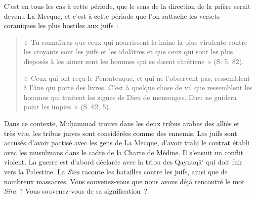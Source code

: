 C'est en tous les cas à cette période, que le sens de la direction de la
prière serait devenu La Mecque, et c'est à cette période que l'on
rattache les versets coraniques les plus hostiles aux juifs~:

\begin{quote}
    

«~Tu connaîtras que ceux qui nourrissent la haine la plus virulente
contre les croyants sont les juifs et les idolâtres et que ceux qui sont
les plus disposés à les aimer sont les hommes qui se disent chrétiens~»
(S. 5, 82).

«~Ceux qui ont reçu le Pentateuque, et qui ne l'observent pas,
ressemblent à l'âne qui porte des livres. C'est à quelque chose de vil
que ressemblent les hommes qui traitent les signes de Dieu de mensonges.
Dieu ne guidera point les impies~» (S. 62, 5).
\end{quote}
Dans ce contexte, Muḥammad trouve dans les deux tribus arabes des alliés
et très vite, les tribus juives sont considérées comme des ennemis. Les
juifs sont accusés d'avoir pactisé avec les gens de La Mecque, d'avoir
trahi le contrat établi avec les musulmans dans le cadre de la Charte de
Médine. Il s'ensuit un conflit violent. La guerre est d'abord déclarée
avec la tribu des Qaynuqā` qui doit fuir vers la Palestine. La
\emph{Sīra} raconte les batailles contre les juifs, ainsi que de
nombreux massacres. Vous souvenez-vous que nous avons déjà rencontré le
mot \emph{Sīra}~? Vous souvenez-vous de sa signification~?


